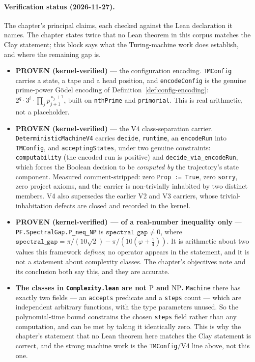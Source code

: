 \paragraph{Verification status (2026-11-27).}
The chapter's principal claims, each checked against the Lean declaration it
names. The chapter states twice that no Lean theorem in this corpus matches the
Clay statement; this block says what the Turing-machine work does establish,
and where the remaining gap is.
\begin{itemize}

\item \textbf{PROVEN (kernel-verified)} --- the configuration encoding.
\texttt{TMConfig} carries a state, a tape and a head position, and
\texttt{encodeConfig} is the genuine prime-power G\"odel encoding of
Definition~\ref{def:config-encoding}:
$2^{q} \cdot 3^{i} \cdot \prod_j p_{j+1}^{\,a_j+1}$, built on
\texttt{nthPrime} and \texttt{primorial}. This is real arithmetic, not a
placeholder.

\item \textbf{PROVEN (kernel-verified)} --- the V4 class-separation carrier.
\texttt{DeterministicMachineV4} carries \texttt{decide}, \texttt{runtime}, an
\texttt{encodeRun} into \texttt{TMConfig}, and \texttt{acceptingStates}, under
two genuine constraints: \texttt{computability} (the encoded run is positive)
and \texttt{decide\_via\_encodeRun}, which forces the Boolean decision to be
\emph{computed by} the trajectory's state component. Measured
comment-stripped: zero \texttt{Prop := True}, zero \texttt{sorry}, zero
project axioms, and the carrier is non-trivially inhabited by two distinct
members. V4 also supersedes the earlier V2 and V3 carriers, whose
trivial-inhabitation defects are closed and recorded in the kernel.

\item \textbf{PROVEN (kernel-verified) --- of a real-number inequality
only} --- \texttt{PF.SpectralGap.P\_neq\_NP} is
$\texttt{spectral\_gap} \neq 0$, where
$\texttt{spectral\_gap} = \pi/(10\sqrt2) - \pi/(10(\varphi+\frac14))$. It is
arithmetic about two values this framework \emph{defines}; no operator appears
in the statement, and it is not a statement about complexity classes. The
chapter's objectives note and its conclusion both say this, and they are
accurate.

\item \textbf{The classes in \texttt{Complexity.lean} are not $\mathrm{P}$ and
$\mathrm{NP}$.} \texttt{Machine} there has exactly two fields --- an
\texttt{accepts} predicate and a \texttt{steps} count --- which are
independent arbitrary functions, with the type parameters unused. So the
polynomial-time bound constrains the chosen \texttt{steps} field rather than
any computation, and can be met by taking it identically zero. This is why the
chapter's statement that no Lean theorem here matches the Clay statement is
correct, and the strong machine work is the \texttt{TMConfig}/V4 line above,
not this one.


\end{itemize}
